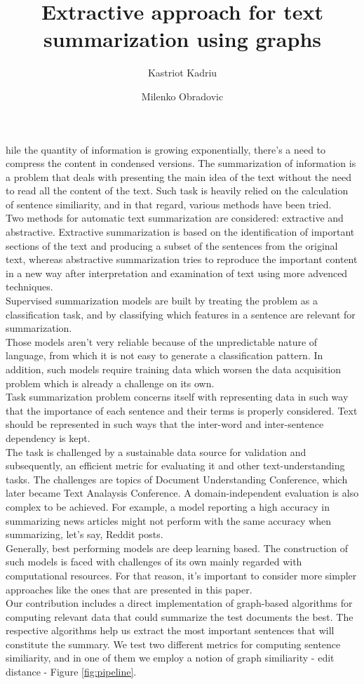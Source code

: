 \documentclass[9pt,twocolumn,twoside]{pnas-report}
\title{Extractive approach for text summarization using graphs}
\author[a,1]{Kastriot Kadriu}
\author[a]{Milenko Obradovic}
\affil[a]{University of Ljubljana, Faculty of Computer and Information Science, Ve\v{c}na pot 113, SI-1000 Ljubljana, Slovenia}
\begin{document}
\maketitle
\thispagestyle{firststyle}
\nocite{*}
hile the quantity of information is growing exponentially, there's a need to compress the content in condensed versions. The summarization of information is a problem that deals with presenting the main idea of the text without the need to read all the content of the text. Such task is heavily relied on the calculation of sentence similiarity, and in that regard, various methods have been tried. \\
Two methods for automatic text summarization are considered: extractive and abstractive. Extractive summarization is based on the identification of important sections of the text and producing a subset of the sentences from the original text, whereas abstractive summarization tries to reproduce the important content in a new way after interpretation and examination of text using more advenced techniques. \\
Supervised summarization models are built by treating the problem as a classification task, and by classifying which features in a sentence are relevant for summarization. \\ Those models aren't very reliable because of the unpredictable nature of language, from which it is not easy to generate a classification pattern. In addition, such models require training data which worsen the data acquisition problem which is already a challenge on its own. \\ 
Task summarization problem concerns itself with representing data in such way that the importance of each sentence and their terms is properly considered. Text should be represented in such ways that the inter-word and inter-sentence dependency is kept.\\
The task is challenged by a sustainable data source for validation and subsequently, an efficient metric for evaluating it and other text-understanding tasks. The challenges are topics of Document Understanding Conference, which later became Text Analaysis Conference. A domain-independent evaluation is also complex to be achieved. For example, a model reporting a high accuracy in summarizing news articles might not perform with the same accuracy when summarizing, let's say, Reddit posts. \\ 
Generally, best performing models are deep learning based. The construction of such models is faced with challenges of its own mainly regarded with computational resources. For that reason, it's important to consider more simpler approaches like the ones that are presented in this paper. \\
Our contribution includes a direct implementation of graph-based algorithms for computing relevant data that could summarize the test documents the best. The respective algorithms help us extract the most important sentences that will constitute the summary. We test two different metrics for computing sentence similiarity, and in one of them we employ a notion of graph similiarity - edit distance - Figure \ref{fig:pipeline}.
\end{document}
